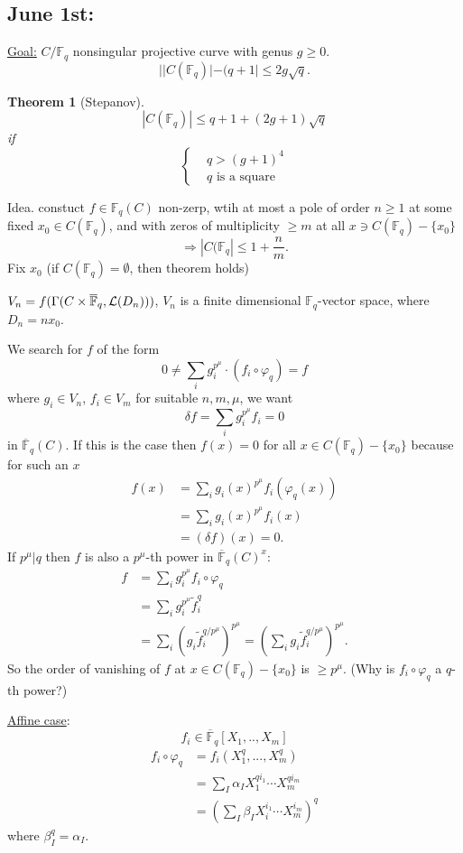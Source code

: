 \documentclass[11pt]{article}
\newtheorem{thm}{Theorem}[section]
\newcommand{\bbf}{\mathbb F}
\newcommand{\call}{{\cal L}}
\newcommand{\Lrta}{\Longrightarrow}
\begin{document}
\subsection{June 1st:}
\underline{Goal:} $C/\bbf_q$ nonsingular projective curve with genus $g\geq 0$.
$$
||C(\bbf_q)|-(q+1|\leq 2g \sqrt{q}.
$$
\begin{thm}
[Stepanov]
$$
|C(\bbf_q)|\leq q+1+(2g+1)\sqrt{q}
$$
if 
$$
\left\{\begin{aligned}
&q> (g+1)^4\\
&q \text{ is a square}
\end{aligned}\right.
$$
\end{thm}

Idea. constuct $f\in \bbf_q(C)$ non-zerp, wtih at most a pole of order $n\geq 1$ at some fixed  $x_0\in C(\bbf_q)$, and with zeros of multiplicity $\geq m$ at all $x\ni C(\bbf_q)-\{x_0\}$
$$
\Lrta |C(\bbf_q|\leq 1+\frac{n}{m}.
$$
Fix $x_0$ (if $C(\bbf_q)=\emptyset$, then theorem holds)

$V_n=f(\Gamma(C\times \overline{\bbf}_q,\call(D_n)))$, $V_n$ is a finite  dimensional $\bbf_q$-vector space, where $D_n=n x_0$.

We search for $f$ of the form 
$$
0\neq \sum_i g_i^{p^{\mu}}\cdot (f_i\circ \varphi_q)=f
$$
where $g_i\in V_n$, $f_i\in V_m$ for suitable $n,m,\mu$, we want
$$
\delta f=\sum_i g_i^{p^\mu} f_i
=0$$
in $\overline{\bbf}_q(C)$. If this is the case then $f(x)=0$ for all $x\in C(\bbf_q)-\{x_0\}$ because  for such an $x$ 
$$
\begin{aligned}
f(x)&=\sum_i g_i(x)^{p^\mu} f_i (\varphi_q(x))\\
&=\sum_i g_i(x)^{p^\mu}f_i(x)\\
&=(\delta f)(x)=0.
\end{aligned}
$$
If $p^\mu|q$ then $f$ is also a $p^\mu$-th power in $\overline{\bbf}_q(C)^x$:
$$
\begin{aligned}
f&= \sum_i g_i^{p^\mu} f_i \circ \varphi_q\\
&= \sum_i g_i^{p^\mu} \tilde{f}_i^{q}\\
&=\sum_i (g_i \tilde{f}_i^{q/p^{\mu}})^{p^{\mu}}=\left(\sum_i g_i \tilde{f}_i^{q/p^\mu}\right)^{p^\mu}.
\end{aligned}
$$
So the order of vanishing of $f$ at $x\in C(\bbf_q)-\{x_0\}$ is $\geq p^\mu$.
(Why is $f_i\circ \varphi_q$ a $q$-th power?)

\underline{Affine case}:
$$
f_i\in\overline{\bbf}_q[X_1,..,X_m]
$$
$$
\begin{aligned}
f_i\circ \varphi_q&=f_i(X_1^q,...,X_m^q)\\
& =\sum_{I}\alpha_I X_1^{ q i_1}\cdots X_m^{q i_m}\\
&= \left(\sum_I \beta_I X_i^{i_1}\cdots X_m^{i_m}\right)^q
\end{aligned}
$$
where $\beta_I^q=\alpha_I$.
\end{document}
